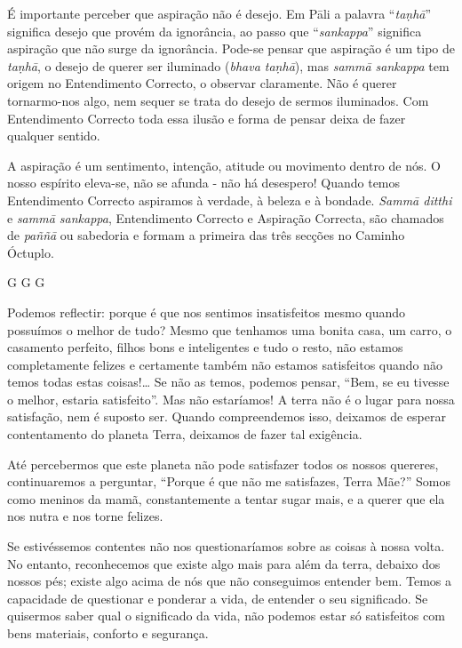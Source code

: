 É importante perceber que aspiração não é desejo. Em Pāli a palavra
“\emph{taṇhā}” significa desejo que provém da ignorância, ao passo que
“\emph{sankappa}” significa aspiração que não surge da ignorância. Pode-se
pensar que aspiração é um tipo de \emph{taṇhā}, o desejo de querer ser iluminado
(\emph{bhava taṇhā}), mas \emph{sammā sankappa} tem origem no Entendimento
Correcto, o observar claramente. Não é querer tornarmo-nos algo, nem sequer se
trata do desejo de sermos iluminados. Com Entendimento Correcto toda essa ilusão
e forma de pensar deixa de fazer qualquer sentido.

A aspiração é um sentimento, intenção, atitude ou movimento dentro de nós. O
nosso espírito eleva-se, não se afunda - não há desespero! Quando temos
Entendimento Correcto aspiramos à verdade, à beleza e à bondade. \emph{Sammā
  ditthi} e \emph{sammā sankappa}, Entendimento Correcto e Aspiração Correcta,
são chamados de \emph{paññā} ou sabedoria e formam a primeira das três secções
no Caminho Óctuplo.

G G G

Podemos reflectir: porque é que nos sentimos insatisfeitos mesmo quando
possuímos o melhor de tudo? Mesmo que tenhamos uma bonita casa, um carro, o
casamento perfeito, filhos bons e inteligentes e tudo o resto, não estamos
completamente felizes e certamente também não estamos satisfeitos quando não
temos todas estas coisas!\ldots{} Se não as temos, podemos pensar, “Bem, se eu
tivesse o melhor, estaria satisfeito”. Mas não estaríamos! A terra não é o lugar
para nossa satisfação, nem é suposto ser. Quando compreendemos isso, deixamos de
esperar contentamento do planeta Terra, deixamos de fazer tal exigência.

Até percebermos que este planeta não pode satisfazer todos os nossos quereres,
continuaremos a perguntar, “Porque é que não me satisfazes, Terra Mãe?” Somos
como meninos da mamã, constantemente a tentar sugar mais, e a querer que ela nos
nutra e nos torne felizes.

Se estivéssemos contentes não nos questionaríamos sobre as coisas à nossa volta.
No entanto, reconhecemos que existe algo mais para além da terra, debaixo dos
nossos pés; existe algo acima de nós que não conseguimos entender bem. Temos a
capacidade de questionar e ponderar a vida, de entender o seu significado. Se
quisermos saber qual o significado da vida, não podemos estar só satisfeitos com
bens materiais, conforto e segurança.

